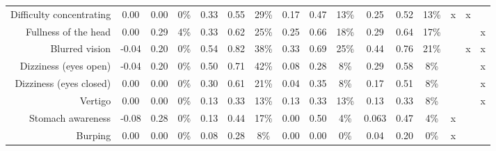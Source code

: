 \begin{table*}[!h]
{\begin{tabular}{r|ccc|ccc|ccc|ccc|ccc}
Difficulty concentrating & 0.00  & 0.00 & 0\%             & 0.33    & 0.55    & 29\%               & 0.17     & 0.47    & 13\%               & 0.25     & 0.52    & 13\%               & x & x &   \\
Fullness of the head     & 0.00  & 0.29 & 4\%             & 0.33    & 0.62    & 25\%               & 0.25     & 0.66    & 18\%               & 0.29     & 0.64    & 17\%               &   &   & x \\
Blurred vision           & -0.04 & 0.20 & 0\%             & 0.54    & 0.82    & 38\%               & 0.33     & 0.69    & 25\%               & 0.44     & 0.76    & 21\%               &   & x & x \\
Dizziness (eyes open)    & -0.04 & 0.20 & 0\%             & 0.50    & 0.71    & 42\%               & 0.08     & 0.28    & 8\%                & 0.29     & 0.58    & 8\%                &   &   & x \\
Dizziness (eyes closed)  & 0.00  & 0.00 & 0\%             & 0.30    & 0.61    & 21\%               & 0.04     & 0.35    & 8\%                & 0.17     & 0.51    & 8\%                &   &   & x \\
Vertigo                  & 0.00  & 0.00 & 0\%             & 0.13    & 0.33    & 13\%               & 0.13     & 0.33    & 13\%               & 0.13     & 0.33    & 8\%                &   &   & x \\
Stomach awareness        & -0.08 & 0.28 & 0\%             & 0.13    & 0.44    & 17\%               & 0.00     & 0.50    & 4\%                & 0.063    & 0.47    & 4\%                & x &   &   \\
Burping                  & 0.00  & 0.00 & 0\%             & 0.08    & 0.28    & 8\%                & 0.00     & 0.00    & 0\%                & 0.04     & 0.20    & 0\%                & x &   &   \\ 
  \bottomrule
\end{tabular}%
}
\end{table*}

